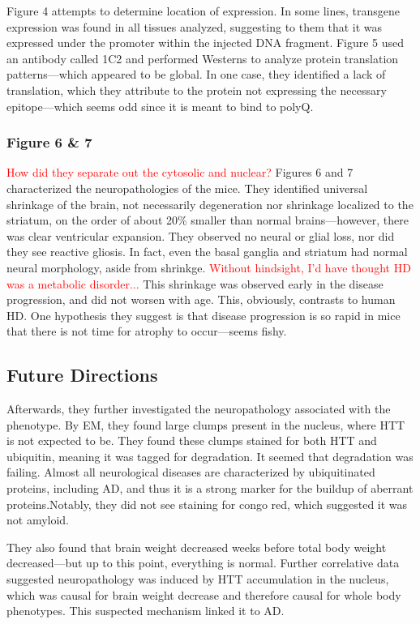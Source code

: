  Figure 4 attempts to determine location of expression. In some lines, transgene expression was found in all tissues analyzed, suggesting to them that it was expressed under the promoter within the injected DNA fragment. Figure 5 used an antibody called 1C2 and performed Westerns to analyze protein translation patterns---which appeared to be global. In one case, they identified a lack of translation, which they attribute to the protein not expressing the necessary epitope---which seems odd since it is meant to bind to polyQ. 

\subsubsection*{Figure 6 \& 7}

\textcolor{red}{How did they separate out the cytosolic and nuclear?} Figures 6 and 7 characterized the neuropathologies of the mice. They identified universal shrinkage of the brain, not necessarily degeneration nor shrinkage localized to the striatum, on the order of about 20\% smaller than normal brains---however, there was clear ventricular expansion. They observed no neural or glial loss, nor did they see reactive gliosis. In fact, even the basal ganglia and striatum had normal neural morphology, aside from shrinkge. \textcolor{red}{Without hindsight, I'd have thought HD was a metabolic disorder...} This shrinkage was observed early in the disease progression, and did not worsen with age. This, obviously, contrasts to human HD. One hypothesis they suggest is that disease progression is so rapid in mice that there is not time for atrophy to occur---seems fishy. 

\subsection*{Future Directions}
Afterwards, they further investigated the neuropathology associated with the phenotype. By EM, they found large clumps present in the nucleus, where HTT is not expected to be. They found these clumps stained for both HTT and ubiquitin, meaning it was tagged for degradation. It seemed that degradation was failing. Almost all neurological diseases are characterized by ubiquitinated proteins, including AD, and thus it is a strong marker for the buildup of aberrant proteins.Notably, they did not see staining for congo red, which suggested it was not amyloid. \newline

They also found that brain weight decreased weeks before total body weight decreased---but up to this point, everything is normal. Further correlative data suggested neuropathology was induced by HTT accumulation in the nucleus, which was causal for brain weight decrease and therefore causal for whole body phenotypes. This suspected mechanism linked it to AD.\newline


